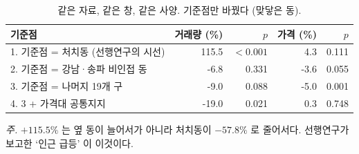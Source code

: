 \begin{table}[htbp]
  \centering
  \caption{같은 자료, 같은 창, 같은 사양. 기준점만 바꿨다 (맞닿은 동).}
  \label{tab:spill-bench}
  \begin{tabular}{lrrrr}
    \toprule
    \textbf{기준점} & \textbf{거래량 (\%)} & \textbf{$p$} & \textbf{가격 (\%)} & \textbf{$p$} \\
    \midrule
    1. 기준점 = 처치동 (선행연구의 시선) & 115.5 & $<0.001$ & 4.3 & 0.111 \\
    2. 기준점 = 강남·송파 비인접 동 & -6.8 & 0.331 & -3.6 & 0.055 \\
    3. 기준점 = 나머지 19개 구 & -9.0 & 0.088 & -5.0 & 0.001 \\
    4. 3 + 가격대 공통지지 & -19.0 & 0.021 & 0.3 & 0.748 \\
    \bottomrule
  \end{tabular}

  \begin{minipage}{\linewidth}\footnotesize
  \textit{주.} $+115.5\%$ 는 옆 동이 늘어서가 아니라 처치동이 $-57.8\%$ 로 줄어서다. 선행연구가 보고한 `인근 급등' 이 이것이다.
  \end{minipage}
\end{table}
